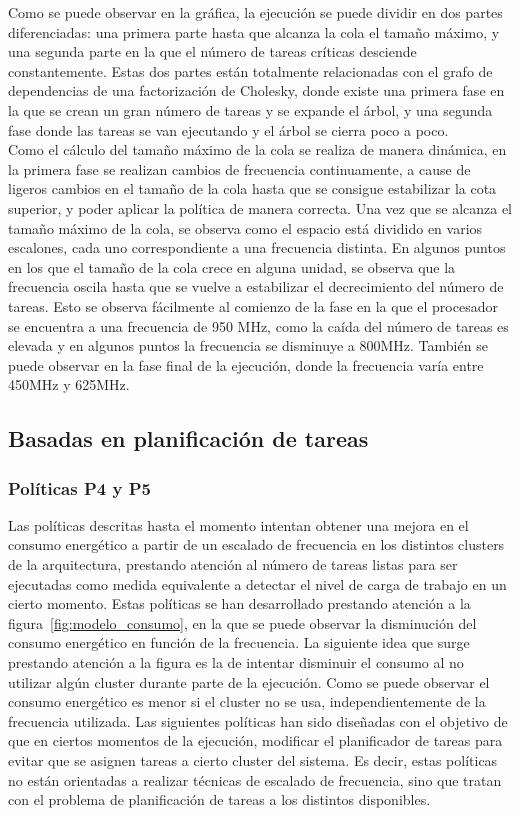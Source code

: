 Como se puede observar en la gráfica, la ejecución se puede dividir en dos
partes diferenciadas: una primera parte hasta que alcanza la cola el tamaño
máximo, y una segunda parte en la que el número de tareas críticas
desciende constantemente. Estas dos partes están totalmente relacionadas
con el grafo de dependencias de una factorización de Cholesky, donde existe
una primera fase en la que se crean un gran número de tareas y se expande
el árbol, y una segunda fase donde las tareas se van ejecutando y el árbol
se cierra poco a poco.\\
Como el cálculo del tamaño máximo de la cola se realiza de manera dinámica,
en la primera fase se realizan cambios de frecuencia continuamente, a cause
de ligeros cambios en el tamaño de la cola hasta que se consigue
estabilizar la cota superior, y poder aplicar la política de manera
correcta. Una vez que se alcanza el tamaño máximo de la cola, se observa
como el espacio está dividido en varios escalones, cada uno correspondiente
a una frecuencia distinta. En algunos puntos en los que el tamaño de la
cola crece en alguna unidad, se observa que la frecuencia oscila hasta que
se vuelve a estabilizar el decrecimiento del número de tareas. Esto se
observa fácilmente al comienzo de la fase en la que el procesador se
encuentra a una frecuencia de 950 MHz, como la caída del número de tareas
es elevada y en algunos puntos la frecuencia se disminuye a 800MHz. También
se puede observar en la fase final de la ejecución, donde la frecuencia
varía entre 450MHz y 625MHz.

\subsection[Basadas en planificación de tareas (P4, P5 y P6)]{Basadas en planificación de tareas}
\subsubsection{Políticas P4 y P5}
Las políticas descritas hasta el momento intentan obtener una mejora en el
consumo energético a partir de un escalado de frecuencia en los distintos
clusters de la arquitectura, prestando atención al número de tareas listas
para ser ejecutadas como medida equivalente a detectar el nivel de carga de
trabajo en un cierto momento. Estas políticas se han desarrollado prestando
atención a la figura~\ref{fig:modelo_consumo}, en la que se puede observar la disminución
del consumo energético en función de la frecuencia. La siguiente idea que
surge prestando atención a la figura es la de intentar disminuir el consumo
al no utilizar algún cluster durante parte de la ejecución. Como se puede
observar el consumo energético es menor si el cluster no se usa,
independientemente de la frecuencia utilizada. Las siguientes políticas han
sido diseñadas con el objetivo de que en ciertos momentos de la ejecución,
modificar el planificador de tareas para evitar que se asignen tareas a
cierto cluster del sistema. Es decir, estas políticas no están orientadas a
realizar técnicas de escalado de frecuencia, sino que tratan con el
problema de planificación de tareas a los distintos \wts disponibles.\\

